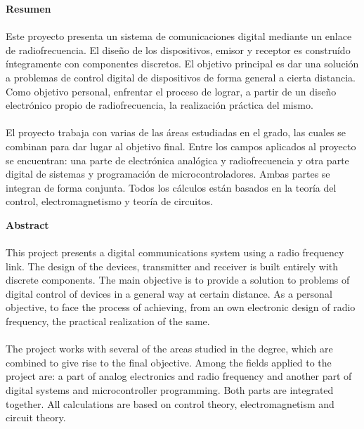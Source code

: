 \documentclass[11pt, a4paper]{article} %
\begin{document}
%    

\newpage



{\bfseries \large Resumen} %
\paragraph{}
Este proyecto presenta un sistema de comunicaciones digital mediante un enlace de radiofrecuencia.
El diseño de los dispositivos, emisor y receptor es construído íntegramente con componentes discretos.
El objetivo principal es dar una solución a problemas de control digital de dispositivos de forma general a cierta distancia. 
Como objetivo personal, enfrentar el proceso de lograr, a partir de un diseño electrónico propio de radiofrecuencia, la realización práctica del mismo.
\paragraph{}
El proyecto trabaja con varias de las \'areas estudiadas en el grado, las cuales se combinan para dar lugar al objetivo final. 
Entre los campos aplicados al proyecto se encuentran: una parte de electr\'onica anal\'ogica y radiofrecuencia y otra parte digital de sistemas y programaci\'on de microcontroladores. Ambas partes se integran de forma conjunta. Todos los c\'alculos est\'an basados en la teoría del control, electromagnetismo y teoría de circuitos.

\vspace{1cm}

{\bfseries \large Abstract} %
\paragraph{}
This project presents a digital communications system using a radio frequency link.
The design of the devices, transmitter and receiver is built entirely with discrete components.
The main objective is to provide a solution to problems of digital control of devices in a general way at certain distance. 
As a personal objective, to face the process of achieving, from an own electronic design of radio frequency, the practical realization of the same.
\paragraph{}
The project works with several of the areas studied in the degree, which are combined to give rise to the final objective. 
Among the fields applied to the project are: a part of analog electronics and radio frequency and another part of digital systems and microcontroller programming. Both parts are integrated together. All calculations are based on control theory, electromagnetism and circuit theory.
\vspace{1cm}
\end{document}
